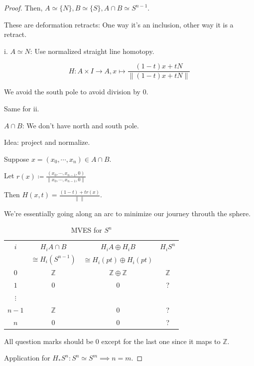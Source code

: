 \documentclass{article}
\theoremstyle{definition}
\begin{document}
\begin{proof}
        Then, \(A \simeq \{ N \}, B \simeq \{ S \}, A\cap B \simeq S^{n-1}\).

        These are deformation retracts: One way it's an inclusion, other way it is a retract.

        i. \(A \simeq N\): Use normalized straight line homotopy.

        \[
            H: A \times I \to  A, x \mapsto \frac{(1-t)x + tN}{\lVert (1-t)x + tN \rVert}
        \]

        We avoid the south pole to avoid division by \(0\).

        Same for ii.

        \(A\cap B\): We don't have north and south pole.

        Idea: project and normalize.

        Suppose \(x = (x_0, \cdots , x_n) \in A \cap B\).

        Let \(r(x)\coloneqq \frac{(x_0, \cdots , x_{n-1}, 0)}{\lVert x_0, \cdots , x_{n-1},0 \rVert }\)

        Then \(H(x,t) = \frac{(1-t) + t r(x)}{\lVert  \rVert}\).

        We're essentially going along an arc to minimize our journey throuth the sphere.

        \begin{table}[H]
            \centering
            \begin{tabular}{c|c|c|c}
                \toprule
                    \(i\) & \(H_i A \cap B\) & \(H_i A \oplus H_i B\) & \(H_i S^n\) \\
                    & \(\cong H_i(S^{n-1})\) & \(\cong H_i(pt) \oplus H_i(pt)\) & \\  
                \midrule
                    \(0\)  & \(\mathbb{Z}\)  & \(\mathbb{Z} \oplus \mathbb{Z}\) & \(\mathbb{Z}\) \\
                    \(1\)  & \(0\) & \(0\) & ? \\
                    \(\vdots\)  &  &  &  \\
                    \(n-1\)  & \(\mathbb{Z}\) & \(0\) & ? \\
                    \(n\) & \(0\) & \(0\) & ? \\
                \bottomrule
            \end{tabular}
            \caption{MVES for \(S^n\)}
        \end{table}

        All question marks should be \(0\) except for the last one since it maps to \(\mathbb{Z}\).

        Application for \(H_{\ast} S^n: S^n \simeq S^m \implies n = m\).

    \end{proof}
\end{document}
